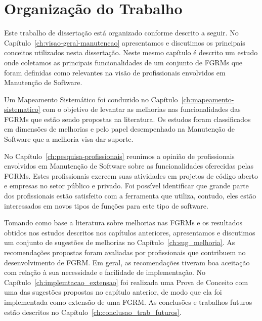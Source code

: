 \section{Organização do Trabalho}
\label{sec:intro-organizacao-dissertacao}

Este trabalho de dissertação está organizado conforme descrito a seguir. No
Capítulo~\ref{ch:visao-geral-manutencao} apresentamos e discutimos os principais
conceitos utilizados nesta dissertação. Neste mesmo capítulo é descrito um
estudo onde coletamos as principais funcionalidades de um conjunto de FGRMs que
foram definidas como relevantes na visão de profissionais envolvidos em
Manutenção de Software.

Um Mapeamento Sistemático foi conduzido no
Capítulo~\ref{ch:mapeamento-sistematico} com o objetivo de levantar as melhorias
nas funcionalidades das FGRMs que estão sendo propostas na literatura. Os
estudos foram classificados em dimensões de melhorias e pelo papel desempenhado
na Manutenção de Software que a melhoria visa dar suporte.

No Capítulo~\ref{ch:pesquisa-profissionais} reunimos a opinião de profissionais
envolvidos em Manutenção de Software sobre as funcionalidades oferecidas pelas
FGRMs. Estes profissionais exercem suas atividades em projetos de código aberto
e empresas no setor público e privado. Foi possível identificar que grande parte
dos profissionais estão satisfeito com a ferramenta que utiliza, contudo, eles
estão interessados em novos tipos de funções para este tipo de software.

Tomando como base a literatura sobre melhorias nas FGRMs e os resultados obtidos
nos estudos descritos nos capítulos anteriores, apresentamos e discutimos um
conjunto de sugestões de melhorias no Capítulo~\ref{ch:sug_melhoria}. As
recomendações propostas foram avaliadas por profissionais que contribuem no
desenvolvimento de FGRM\@. Em geral, as recomendações tiveram boa aceitação com
relação à sua necessidade e facilidade de implementação. No
Capítulo~\ref{ch:implemtacao_extensao} foi realizada uma Prova de Conceito com uma
das sugestões propostas no capítulo anterior, de modo que ela foi implementada
como extensão de uma FGRM\@. As conclusões e trabalhos futuros estão descritos
no Capítulo~\ref{ch:conclusao_trab_futuros}.
